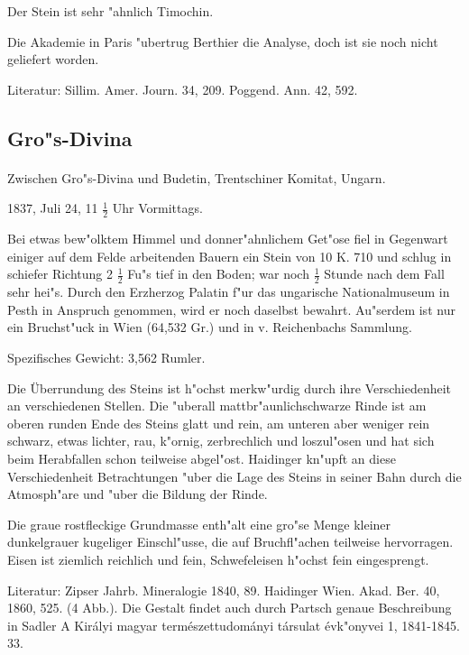 \documentclass[a4paper, 11pt, oneside]{article}
\begin{document}
Der Stein ist sehr "ahnlich Timochin.

Die Akademie in Paris "ubertrug Berthier die Analyse, doch ist sie noch nicht geliefert worden.

\footnotesize
Literatur: Sillim. Amer. Journ. 34, 209. Poggend. Ann. 42, 592.

\subsection{Gro"s-Divina}
\normalsize
\paragraph{}
Zwischen Gro"s-Divina und Budetin, Trentschiner Komitat, Ungarn.

1837, Juli 24, 11 $\frac{1}{2}$ Uhr Vormittags.

Bei etwas bew"olktem Himmel und donner"ahnlichem Get"ose fiel in Gegenwart einiger auf dem Felde arbeitenden Bauern ein Stein von 10 K. 710 und schlug in schiefer Richtung 2 $\frac{1}{2}$ Fu"s tief in den Boden; war noch $\frac{1}{2}$ Stunde nach dem Fall sehr hei"s. Durch den Erzherzog Palatin f"ur das ungarische Nationalmuseum in Pesth in Anspruch genommen, wird er noch daselbst bewahrt. Au"serdem ist nur ein Bruchst"uck in Wien (64,532 Gr.) und in v. Reichenbachs Sammlung.

Spezifisches Gewicht: 3,562 Rumler.

Die Überrundung des Steins ist h"ochst merkw"urdig durch ihre Verschiedenheit an verschiedenen Stellen. Die "uberall mattbr"aunlichschwarze Rinde ist am oberen runden Ende des Steins glatt und rein, am unteren aber weniger rein schwarz, etwas lichter, rau, k"ornig, zerbrechlich und loszul"osen und hat sich beim Herabfallen schon teilweise abgel"ost. Haidinger kn"upft an diese Verschiedenheit Betrachtungen "uber die Lage des Steins in seiner Bahn durch die Atmosph"are und "uber die Bildung der Rinde.

Die graue rostfleckige Grundmasse enth"alt eine gro"se Menge kleiner dunkelgrauer kugeliger Einschl"usse, die auf Bruchfl"achen teilweise hervorragen. Eisen ist ziemlich reichlich und fein, Schwefeleisen h"ochst fein eingesprengt.

\footnotesize
Literatur: Zipser Jahrb. Mineralogie 1840, 89. Haidinger Wien. Akad. Ber. 40, 1860, 525. (4 Abb.). Die Gestalt findet auch durch Partsch genaue Beschreibung in Sadler A Királyi magyar természettudományi társulat évk"onyvei 1, 1841-1845. 33.
\end{document}
